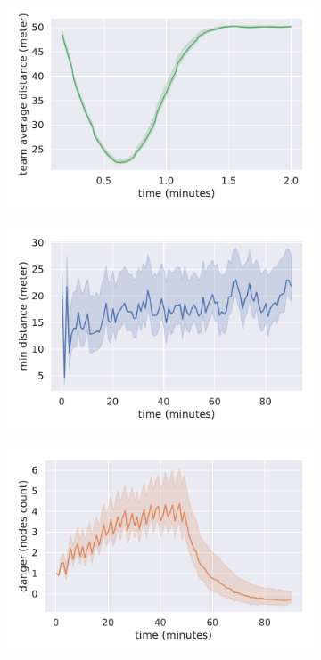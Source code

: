 \begin{figure}[t]
\centering
\begin{subfigure}{0.4\textwidth}
  \centering
  \includegraphics[width=\textwidth]{papers/coordination2023-macro/images/average_intra_team_distance}
  \caption{}
  \label{fig:distance}
\end{subfigure}
\hfill
\begin{subfigure}{0.4\textwidth}
  \centering
  \includegraphics[width=\textwidth]{papers/coordination2023-macro/images/min_distance}
  \caption{}
  \label{fig:min_distance}
\end{subfigure}
\hfill
\begin{subfigure}{0.4\textwidth}
  \centering
  \includegraphics[width=\textwidth]{papers/coordination2023-macro/images/in_danger}

\end{subfigure}
\end{figure}
